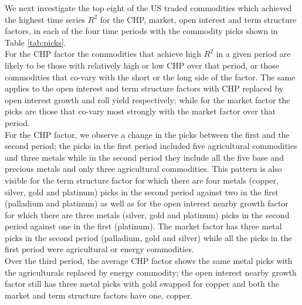 \documentclass[]{elsarticle} %
\begin{document}
\medskip\setlength{\parindent}{0pt}

We next investigate the top eight of the US traded commodities which achieved the highest time series \(R^{2}\) for the CHP, market, open interest and term structure factors, in each of the four time periods with the commodity picks shown in Table \ref{tab:picks}.\\
For the CHP factor the commodities that achieve high \(R^{2}\) in a given period are likely to be those with relatively high or low CHP over that period, or those commodities that co-vary with the short or the long side of the factor. The same applies to the open interest and term structure factors with CHP replaced by open interest growth and roll yield respectively; while for the market factor the picks are those that co-vary most strongly with the market factor over that period.\\
For the CHP factor, we observe a change in the picks between the first and the second period; the picks in the first period included five agricultural commodities and three metals while in the second period they include all the five base and precious metals and only three agricultural commodities. This pattern is also visible for the term structure factor for which there are four metals (copper, silver, gold and platinum) picks in the second period against two in the first (palladium and platinum) as well as for the open interest nearby growth factor for which there are three metals (silver, gold and platinum) picks in the second period against one in the first (platinum). The market factor has three metal picks in the second period (palladium, gold and silver) while all the picks in the first period were agricultural or energy commodities.\\
Over the third period, the average CHP factor shows the same metal picks with the agriculturals replaced by energy commodity; the open interest nearby growth factor still has three metal picks with gold swapped for copper and both the market and term structure factors have one, copper.\\
\end{document}
